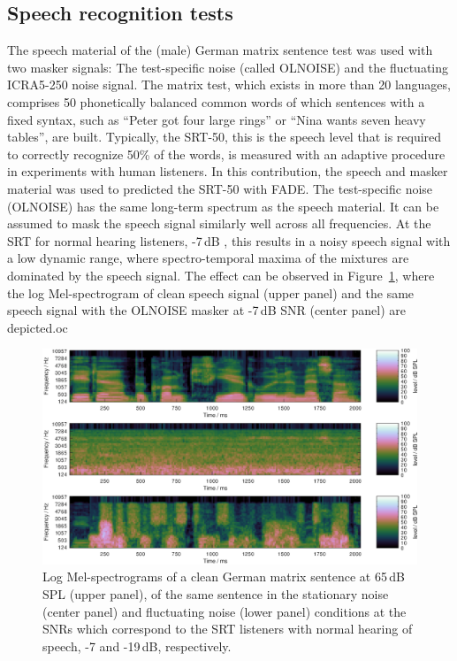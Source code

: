 \documentclass[10pt,a4paper,twocolumn]{article}
\begin{document}
\subsection*{Speech recognition tests}
\label{sec:matrixtests}
%
The speech material of the (male) German matrix sentence test \citep{wagener1999,kollmeier2015} was used with two masker signals: The test-specific noise (called OLNOISE) and the fluctuating ICRA5-250 \citep{dreschler2001,wagener2006} noise signal.
%
The matrix test, which exists in more than 20 languages, comprises 50 phonetically balanced common words of which sentences with a fixed syntax, such as \enquote{Peter got four large rings} or \enquote{Nina wants seven heavy tables}, are built.
%
Typically, the SRT-50, this is the speech level that is required to correctly recognize 50\% of the words, is measured with an adaptive procedure in experiments with human listeners.
%
In this contribution, the speech and masker material was used to predicted the SRT-50 with FADE.
%
The test-specific noise (OLNOISE) has the same long-term spectrum as the speech material.
%
It can be assumed to mask the speech signal similarly well across all frequencies.
%
At the SRT for normal hearing listeners, -7\,dB \citep{hochmuth2015}, this results in a noisy speech signal with a low dynamic range, where spectro-temporal maxima of the mixtures are dominated by the speech signal.
%
The effect can be observed in Figure~\ref{fig:3}, where the log Mel-spectrogram of clean speech signal (upper panel) and the same speech signal with the OLNOISE masker at -7\,dB SNR (center panel) are depicted.oc
%
\begin{figure}[h]
	\centerline{\includegraphics[width=1.0\textwidth]{images/speech-noise}}
	\caption{Log Mel-spectrograms of a clean German matrix sentence at 65\,dB SPL (upper panel), of the same sentence in the stationary noise (center panel) and fluctuating noise (lower panel) conditions at the SNRs which correspond to the SRT listeners with normal hearing of speech, -7 and -19\,dB, respectively.}
	\label{fig:3}
\end{figure}
\end{document}
